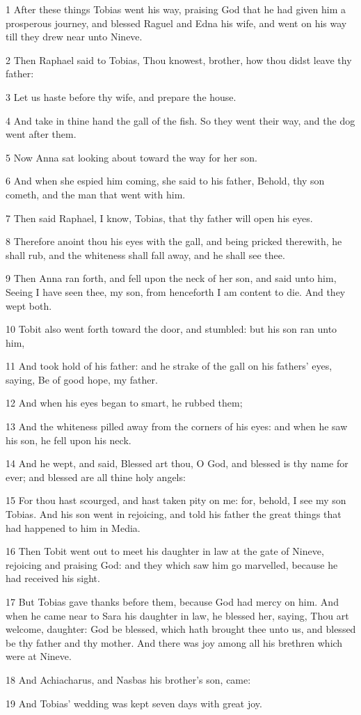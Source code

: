 \par 1 After these things Tobias went his way, praising God that he had given him a prosperous journey, and blessed Raguel and Edna his wife, and went on his way till they drew near unto Nineve.
\par 2 Then Raphael said to Tobias, Thou knowest, brother, how thou didst leave thy father:
\par 3 Let us haste before thy wife, and prepare the house.
\par 4 And take in thine hand the gall of the fish. So they went their way, and the dog went after them.
\par 5 Now Anna sat looking about toward the way for her son.
\par 6 And when she espied him coming, she said to his father, Behold, thy son cometh, and the man that went with him.
\par 7 Then said Raphael, I know, Tobias, that thy father will open his eyes.
\par 8 Therefore anoint thou his eyes with the gall, and being pricked therewith, he shall rub, and the whiteness shall fall away, and he shall see thee.
\par 9 Then Anna ran forth, and fell upon the neck of her son, and said unto him, Seeing I have seen thee, my son, from henceforth I am content to die. And they wept both.
\par 10 Tobit also went forth toward the door, and stumbled: but his son ran unto him,
\par 11 And took hold of his father: and he strake of the gall on his fathers' eyes, saying, Be of good hope, my father.
\par 12 And when his eyes began to smart, he rubbed them;
\par 13 And the whiteness pilled away from the corners of his eyes: and when he saw his son, he fell upon his neck.
\par 14 And he wept, and said, Blessed art thou, O God, and blessed is thy name for ever; and blessed are all thine holy angels:
\par 15 For thou hast scourged, and hast taken pity on me: for, behold, I see my son Tobias. And his son went in rejoicing, and told his father the great things that had happened to him in Media.
\par 16 Then Tobit went out to meet his daughter in law at the gate of Nineve, rejoicing and praising God: and they which saw him go marvelled, because he had received his sight.
\par 17 But Tobias gave thanks before them, because God had mercy on him. And when he came near to Sara his daughter in law, he blessed her, saying, Thou art welcome, daughter: God be blessed, which hath brought thee unto us, and blessed be thy father and thy mother. And there was joy among all his brethren which were at Nineve.
\par 18 And Achiacharus, and Nasbas his brother's son, came:
\par 19 And Tobias' wedding was kept seven days with great joy.

